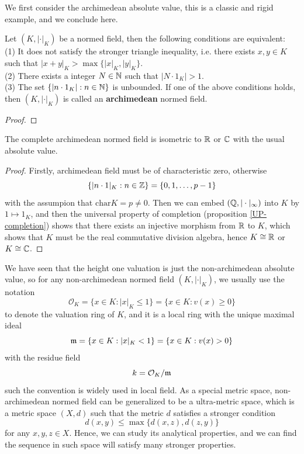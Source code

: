 We first consider the archimedean absolute value, this is a classic and rigid example, and we conclude here.

\begin{lemma}
    Let \((K,|\cdot|_K)\) be a normed field, then the following conditions are equivalent:\\
    (1) It does not satisfy the stronger triangle inequality, i.e. there exists \(x,y \in K\) such that \(|x+y|_K > \max\{|x|_K,|y|_K\}\).\\
    (2) There exists a integer \(N \in \mathbb{N}\) such that \(|N\cdot 1_K|>1\).\\
    (3) The set \(\{|n \cdot 1_K| : n \in \mathbb{N}\}\) is unbounded.
    If one of the above conditions holds, then \((K,|\cdot|_K)\) is called an \textbf{archimedean} normed field.
\end{lemma}
\begin{proof}
    
\end{proof}

\begin{proposition}
    The complete archimedean normed field is isometric to \(\mathbb{R}\) or \(\mathbb{C}\) with the usual absolute value.
\end{proposition}

\begin{proof}
    Firstly, archimedean field must be of characteristic zero, otherwise 
    \[\{|n \cdot 1|_K : n \in \mathbb{Z}\} = \{0,1,\dots,p-1\}\]
    with the assumpion that \(\mathrm{char} K = p \neq 0\). Then we can embed \((\mathbb{Q},|\cdot|_{\infty})\) into \(K\) by \(1 \mapsto 1_K\), and then the universal property of completion (proposition \ref{UP-completion}) shows that there exists an injective morphism from \(\mathbb{R}\) to \(K\), which shows that \(K\) must be the real commutative division algebra, hence \(K \cong \mathbb{R}\) or \(K \cong \mathbb{C}\).
\end{proof}

We have seen that the height one valuation is just the non-archimedean absolute value, so for any non-archimedean normed field \((K,|\cdot|_K)\), we usually use the notation
\[\mathcal{O}_K = \{x \in K: |x|_K \leq 1\} = \{x \in K : v(x) \geq 0\}\]
to denote the valuation ring of \(K\), and it is a local ring with the unique maximal ideal
\[\mathfrak{m} = \{x \in K : |x|_K <1 \} = \{x \in K : v(x) > 0 \}\]
with the residue field
\[k = \mathcal{O}_K/\mathfrak{m}\]
such the convention is widely used in local field. As a special metric space, non-archimedean normed field can be generalized to be a ultra-metric space, which is a metric space \((X,d)\) such that the metric \(d\) satisfies a stronger condition
\[d(x,y) \leq \max\{d(x,z),d(z,y)\}\]
for any \(x,y,z \in X\). Hence, we can study its analytical properties, and we can find the sequence in such space will satisfy many stronger properties.


